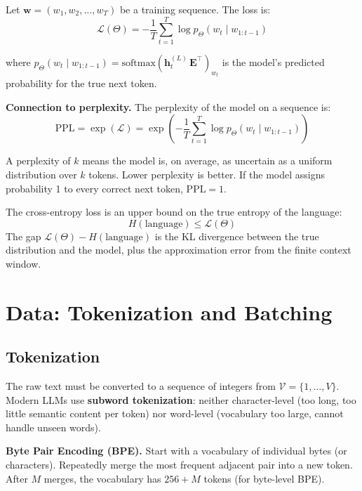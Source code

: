 \documentclass[main.tex]{subfiles}
\begin{document}
Let $\mathbf{w} = (w_1, w_2, \ldots, w_T)$ be a training sequence. The loss is:
$$\mathcal{L}(\Theta) = -\frac{1}{T}\sum_{t=1}^{T}\log p_\Theta(w_t \mid w_{1:t-1})$$

where $p_\Theta(w_t \mid w_{1:t-1}) = \text{softmax}\!\left(\mathbf{h}_t^{(L)}\,\mathbf{E}^\top\right)_{w_t}$ is the model's predicted probability for the true next token.

\textbf{Connection to perplexity.} The perplexity of the model on a sequence is:
$$\text{PPL} = \exp(\mathcal{L}) = \exp\!\left(-\frac{1}{T}\sum_{t=1}^{T}\log p_\Theta(w_t \mid w_{1:t-1})\right)$$

A perplexity of $k$ means the model is, on average, as uncertain as a uniform distribution over $k$ tokens. Lower perplexity is better. If the model assigns probability 1 to every correct next token, $\text{PPL} = 1$.

\begin{remark}
The cross-entropy loss is an upper bound on the true entropy of the language:
$$H(\text{language}) \leq \mathcal{L}(\Theta)$$
The gap $\mathcal{L}(\Theta) - H(\text{language})$ is the KL divergence between the true distribution and the model, plus the approximation error from the finite context window.
\end{remark}

\needspace{0.33\textheight}
\section{Data: Tokenization and Batching}

\subsection{Tokenization}

The raw text must be converted to a sequence of integers from $\mathcal{V} = \{1, \ldots, V\}$. Modern LLMs use \textbf{subword tokenization}: neither character-level (too long, too little semantic content per token) nor word-level (vocabulary too large, cannot handle unseen words).

\textbf{Byte Pair Encoding (BPE).} Start with a vocabulary of individual bytes (or characters). Repeatedly merge the most frequent adjacent pair into a new token. After $M$ merges, the vocabulary has $256 + M$ tokens (for byte-level BPE).
\end{document}
